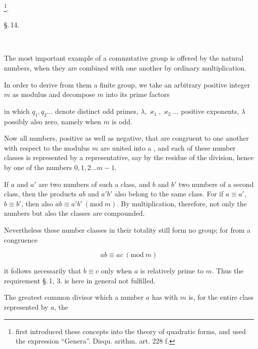 
\footnote{ first introduced these concepts into the theory of quadratic forms, and used the expression ``Genera''. Disqu. arithm. art. 228 f.}.

\begin{center}
\S.\,14.
\end{center}

\begin{center}
\\
\end{center}

The most important example of a commutative group is offered by the natural numbers, when they are combined with one another by ordinary multiplication.

In order to derive from them a finite group, we take an arbitrary positive integer $m$ as modulus and decompose $m$ into its prime factors


in which $q_1, q_2 \ldots$ denote distinct odd primes, $\lambda, \varkappa_1, \varkappa_2 \ldots$ positive exponents, $\lambda$ possibly also zero, namely when $m$ is odd.

Now all numbers, positive as well as negative, that are congruent to one another with respect to the modulus $m$ are united into a , and each of these number classes is represented by a representative, say by the residue of the division, hence by one of the numbers $0, 1, 2 \ldots m-1$.

If $a$ and $a'$ are two numbers of such a class, and $b$ and $b'$ two numbers of a second class, then the products $ab$ and $a'b'$ also belong to the same class. For if $a \equiv a'$, $b \equiv b'$, then also $ab \equiv a'b'\ (\mathrm{mod}\ m)$. By multiplication, therefore, not only the numbers but also the classes are compounded.

Nevertheless these number classes in their totality still form no group; for from a congruence

\[
ab \equiv ac\ (\mathrm{mod}\ m)
\]

it follows necessarily that $b \equiv c$ only when $a$ is relatively prime to $m$. Thus the requirement \S.\,1, 3. is here in general not fulfilled.

The greatest common divisor which a number $a$ has with $m$ is, for the entire class represented by $a$, the
